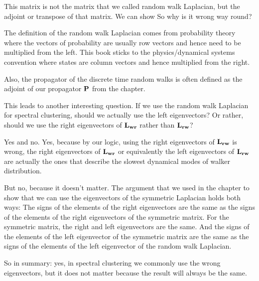 This matrix is not the matrix that we called random walk Laplacian,
but the adjoint or transpose of that matrix. We can show 
So why is it wrong way round?

The definition of the random walk Laplacian comes from probability theory where the vectors of probability are usually row vectors and hence need to be multiplied from the left. This book sticks to the physics/dynamical systems convention where states are column vectors and hence multiplied from the right.

Also, the propagator of the discrete time random walks is often defined as the adjoint of our propagator $\bf P$ from the chapter. 

This leads to another interesting question. If we use the random walk Laplacian for spectral clustering, should we actually use the left eigenvectors? Or rather, should we use the right eigenvectors of $\bf L_{wr}$ rather than $\bf L_{rw}$? 

Yes and no. Yes, because by our logic, using the right eigenvectors of $\bf L_{rw}$ is wrong, the right eigenvectors of $\bf L_{wr}$ or equivalently  the left eigenvectors of $\bf L_{rw}$ are actually the ones that describe the slowest dynamical modes of walker distribution. 

But no, because it doesn't matter. The argument that we used in the chapter to show that we can use the eigenvectors of the symmetric Laplacian holds both ways: The signs of the elements of the right eigenvectors are the same as the signs of the elements of the right eigenvectors of the symmetric matrix. For the symmetric matrix, the right and left eigenvectors are the same. And the signs of the elements of the left eigenvector of the symmetric matrix are the same as the signs of the elements of the left eigenvector of the random walk Laplacian. 

So in summary: yes, in spectral clustering we commonly use the wrong eigenvectors, but it does not matter because the result will always be the same. 